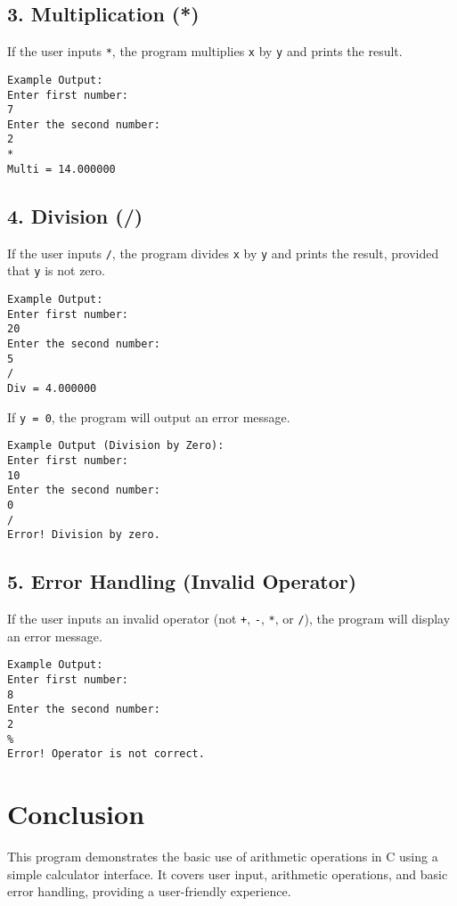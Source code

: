 \documentclass[a4paper,14pt]{article}
\begin{document}
\subsection*{3. Multiplication (*)}
If the user inputs \texttt{*}, the program multiplies \texttt{x} by \texttt{y} and prints the result.
\begin{verbatim}
Example Output:
Enter first number: 
7 
Enter the second number: 
2 
* 
Multi = 14.000000
\end{verbatim}

\subsection*{4. Division (/)}
If the user inputs \texttt{/}, the program divides \texttt{x} by \texttt{y} and prints the result, provided that \texttt{y} is not zero.
\begin{verbatim}
Example Output:
Enter first number: 
20 
Enter the second number: 
5 
/ 
Div = 4.000000
\end{verbatim}

If \texttt{y = 0}, the program will output an error message.
\begin{verbatim}
Example Output (Division by Zero):
Enter first number: 
10 
Enter the second number: 
0 
/ 
Error! Division by zero.
\end{verbatim}

\subsection*{5. Error Handling (Invalid Operator)}
If the user inputs an invalid operator (not \texttt{+}, \texttt{-}, \texttt{*}, or \texttt{/}), the program will display an error message.
\begin{verbatim}
Example Output:
Enter first number: 
8 
Enter the second number: 
2 
% 
Error! Operator is not correct.
\end{verbatim}

\section*{Conclusion}
This program demonstrates the basic use of arithmetic operations in C using a simple calculator interface. It covers user input, arithmetic operations, and basic error handling, providing a user-friendly experience.
\end{document}
